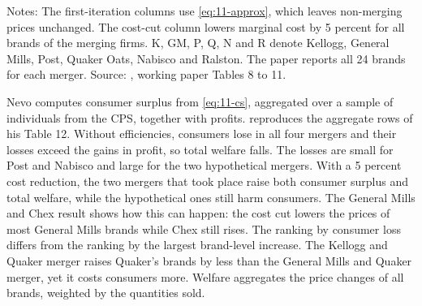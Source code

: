 \begin{table}[htbp]
\smallskip
\begin{minipage}{0.95\linewidth}
\footnotesize
Notes: The first-iteration columns use \eqref{eq:11-approx}, which leaves non-merging prices unchanged. The cost-cut
column lowers marginal cost by 5 percent for all brands of the merging firms. K, GM, P, Q, N and R denote Kellogg,
General Mills, Post, Quaker Oats, Nabisco and Ralston. The paper reports all 24 brands for each
merger. Source: \citet{Nevo2000b}, working paper Tables 8 to 11.
\end{minipage}
\end{table}

 Nevo computes consumer surplus from \eqref{eq:11-cs}, aggregated over a sample of individuals from
the CPS, together with profits.  reproduces the aggregate rows of his Table 12. Without
efficiencies, consumers lose in all four mergers and their losses exceed the gains in profit, so total welfare falls.
The losses are small for Post and Nabisco and large for the two hypothetical mergers. With a 5 percent cost reduction,
the two mergers that took place raise both consumer surplus and total welfare, while the hypothetical ones still harm
consumers. The General Mills and Chex result shows how this can happen: the cost cut lowers the prices of most General
Mills brands while Chex still rises. The ranking by consumer loss differs from the ranking by the largest brand-level increase. The Kellogg and Quaker
merger raises Quaker's brands by less than the General Mills and Quaker merger, yet it costs consumers more. Welfare
aggregates the price changes of all brands, weighted by the quantities sold.

